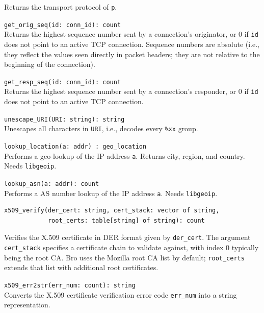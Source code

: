\documentclass[10pt,landscape]{article}
\begin{document}
\begin{multicols*}{2}
\begin{itemize}
{    Returns the transport protocol of \texttt{p}.
  \item \verb|get_orig_seq(id: conn_id): count|\\
    Returns the highest sequence number sent by a connection's originator, or 0
    if \verb|id| does not point to an active TCP connection. Sequence numbers
    are absolute (i.e., they reflect the values seen directly in packet
    headers; they are not relative to the beginning of the connection).
  \item \verb|get_resp_seq(id: conn_id): count|\\
    Returns the highest sequence number sent by a connection's responder, or 0
    if \verb|id| does not point to an active TCP connection.
}
  \item \verb|unescape_URI(URI: string): string|\\
    Unescapes all characters in \texttt{URI}, i.e., decodes every \verb|%xx|
    group.
  \item \verb|lookup_location(a: addr) : geo_location|\\
    Performs a geo-lookup of the IP address \verb|a|. Returns city, region, and
    country. Needs \texttt{libgeoip}.
  \item \verb|lookup_asn(a: addr): count|\\
    Performs a AS number lookup of the IP address \verb|a|. 
    Needs \texttt{libgeoip}.
  \item
\begin{verbatim}
x509_verify(der_cert: string, cert_stack: vector of string,
            root_certs: table[string] of string): count
\end{verbatim}
    Verifies the X.509 certificate in DER format given by \verb|der_cert|. The
    argument \verb|cert_stack| specifies a certificate chain to validate
    against, with index 0 typically being the root CA. Bro uses the Mozilla 
    root CA list by default; \verb|root_certs| extends that list with
    additional root certificates.
  \item \verb|x509_err2str(err_num: count): string|\\
    Converts the X.509 certificate verification error code \verb|err_num| into
    a string representation.
\end{itemize}


\end{multicols*}
\end{document}
